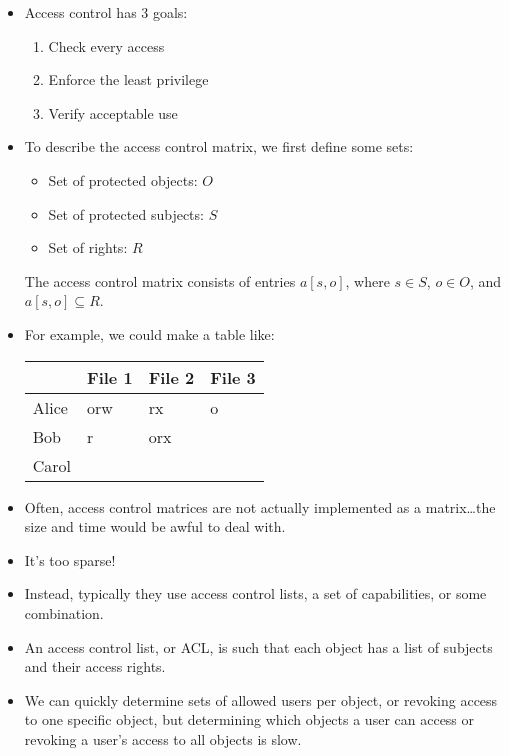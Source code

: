 \documentclass{article}
\begin{document}
\begin{itemize}
    \item Access control has 3 goals:
        \begin{enumerate}
            \item Check every access
            \item Enforce the least privilege
            \item Verify acceptable use
        \end{enumerate}
    \item To describe the access control matrix, we first define some sets:
        \begin{itemize}
            \item Set of protected objects: $O$
            \item Set of protected subjects: $S$
            \item Set of rights: $R$
        \end{itemize}
        The access control matrix consists of entries $a[s, o]$, where $s \in S$, $o \in O$, and $a[s, o] \subseteq R$.
    \item For example, we could make a table like:
        \begin{table}[h]
        \centering
        \begin{tabular}{|l|l|l|l|}
        \hline
              & File 1 & File 2 & File 3 \\ \hline
        Alice & orw    & rx     & o      \\ \hline
        Bob   & r      & orx    &        \\ \hline
        Carol &        &        &        \\ \hline
        \end{tabular}
        \end{table}
    \item Often, access control matrices are not actually implemented as a matrix\dots the size and time would be awful to deal with.
    \item It's too sparse!
    \item Instead, typically they use access control lists, a set of capabilities, or some combination.
    \item An access control list, or ACL, is such that each object has a list of subjects and their access rights.
    \item We can quickly determine sets of allowed users per object, or revoking access to one specific object, but determining which objects a user can access or revoking a user's access to all objects is slow.

\end{itemize}
\end{document}

